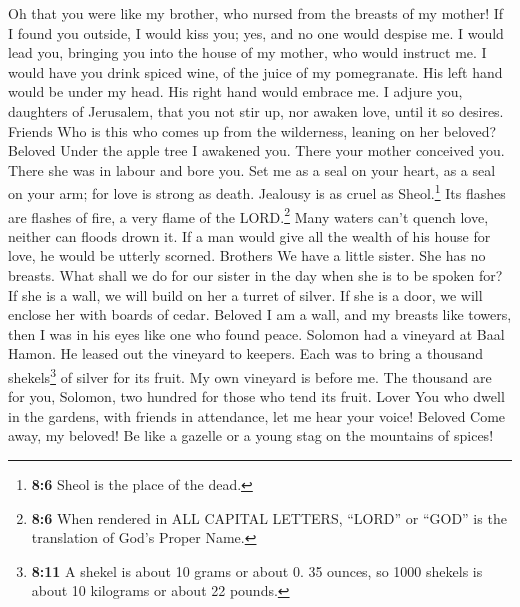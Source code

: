  Oh that you were like my brother, who nursed from the
breasts of my mother! If I found you outside, I would kiss you; yes, and
no one would despise me.  I would lead you, bringing you
into the house of my mother, who would instruct me. I would have you
drink spiced wine, of the juice of my pomegranate.  His
left hand would be under my head. His right hand would embrace me.
 I adjure you, daughters of Jerusalem, that you not stir
up, nor awaken love, until it so desires. Friends  Who is
this who comes up from the wilderness, leaning on her beloved? Beloved
Under the apple tree I awakened you. There your mother conceived you.
There she was in labour and bore you.  Set me as a seal on
your heart, as a seal on your arm; for love is strong as death. Jealousy
is as cruel as Sheol.\footnote{\textbf{8:6} Sheol is the place of the
  dead.} Its flashes are flashes of fire, a very flame of the
LORD.\footnote{\textbf{8:6} When rendered in ALL CAPITAL LETTERS,
  ``LORD'' or ``GOD'' is the translation of God's Proper Name.}
 Many waters can't quench love, neither can floods drown
it. If a man would give all the wealth of his house for love, he would
be utterly scorned. Brothers  We have a little sister. She
has no breasts. What shall we do for our sister in the day when she is
to be spoken for?  If she is a wall, we will build on her
a turret of silver. If she is a door, we will enclose her with boards of
cedar. Beloved  I am a wall, and my breasts like towers,
then I was in his eyes like one who found peace.  Solomon
had a vineyard at Baal Hamon. He leased out the vineyard to keepers.
Each was to bring a thousand shekels\footnote{\textbf{8:11} A shekel is
  about 10 grams or about 0. 35 ounces, so 1000 shekels is about 10
  kilograms or about 22 pounds.} of silver for its fruit.
 My own vineyard is before me. The thousand are for you,
Solomon, two hundred for those who tend its fruit. Lover 
You who dwell in the gardens, with friends in attendance, let me hear
your voice! Beloved  Come away, my beloved! Be like a
gazelle or a young stag on the mountains of spices!
